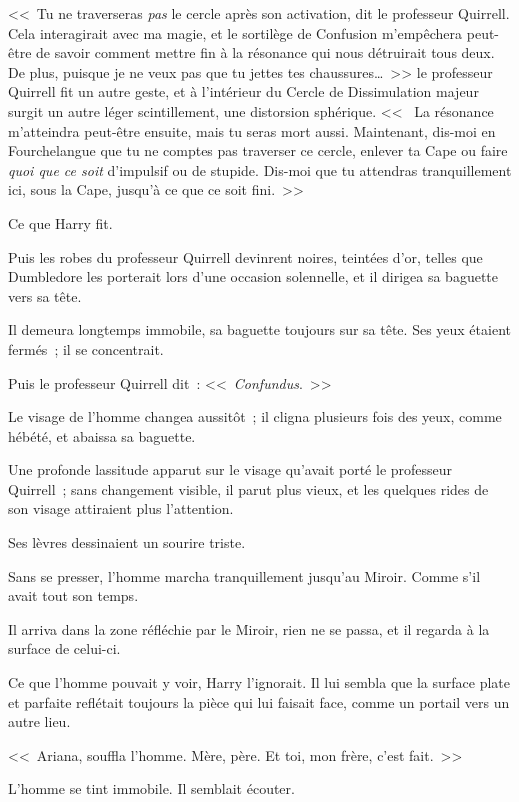 <<~Tu ne traverseras \emph{pas} le cercle après son activation, dit le professeur Quirrell. Cela interagirait avec ma magie, et le sortilège de Confusion m'empêchera peut-être de savoir comment mettre fin à la résonance qui nous détruirait tous deux. De plus, puisque je ne veux pas que tu jettes tes chaussures…~>> le professeur Quirrell fit un autre geste, et à l'intérieur du Cercle de Dissimulation majeur surgit un autre léger scintillement, une distorsion sphérique. <<~ La résonance m'atteindra peut-être ensuite, mais tu seras mort aussi. Maintenant, dis-moi en Fourchelangue que tu ne comptes pas traverser ce cercle, enlever ta Cape ou faire \emph{quoi que ce soit} d'impulsif ou de stupide. Dis-moi que tu attendras tranquillement ici, sous la Cape, jusqu'à ce que ce soit fini.~>>

Ce que Harry fit.

Puis les robes du professeur Quirrell devinrent noires, teintées d'or, telles que Dumbledore les porterait lors d'une occasion solennelle, et il dirigea sa baguette vers sa tête.

Il demeura longtemps immobile, sa baguette toujours sur sa tête. Ses yeux étaient fermés~; il se concentrait.

Puis le professeur Quirrell dit~: <<~\emph{Confundus}.~>>

Le visage de l'homme changea aussitôt~; il cligna plusieurs fois des yeux, comme hébété, et abaissa sa baguette.

Une profonde lassitude apparut sur le visage qu'avait porté le professeur Quirrell~; sans changement visible, il parut plus vieux, et les quelques rides de son visage attiraient plus l'attention.

Ses lèvres dessinaient un sourire triste.

Sans se presser, l'homme marcha tranquillement jusqu'au Miroir. Comme s'il avait tout son temps.

Il arriva dans la zone réfléchie par le Miroir, rien ne se passa, et il regarda à la surface de celui-ci.

Ce que l'homme pouvait y voir, Harry l'ignorait. Il lui sembla que la surface plate et parfaite reflétait toujours la pièce qui lui faisait face, comme un portail vers un autre lieu.

<<~Ariana, souffla l'homme. Mère, père. Et toi, mon frère, c'est fait.~>>

L'homme se tint immobile. Il semblait écouter.

